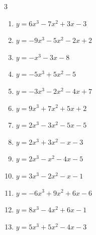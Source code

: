 \begin{multicols}{3}
\begin{enumerate}
  \item $y=6x^{3}-7x^{2}+3x-3$


  \item $y=-9x^{3}-5x^{2}-2x+2$


  \item $y=-x^{3}-3x-8$


  \item $y=-5x^{3}+5x^{2}-5$


  \item $y=-3x^{3}-2x^{2}-4x+7$


  \item $y=9x^{3}+7x^{2}+5x+2$


\columnbreak %

  \item $y=2x^{3}-3x^{2}-5x-5$


  \item $y=2x^{3}+3x^{2}-x-3$


  \item $y=2x^{3}-x^{2}-4x-5$


  \item $y=3x^{3}-2x^{2}-x-1$


  \item $y=-6x^{3}+9x^{2}+6x-6$


  \item $y=8x^{3}-4x^{2}+6x-1$


  \item $y=5x^{3}+5x^{2}-4x-3$


\end{enumerate}
\end{multicols}
